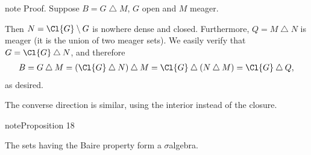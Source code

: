 \documentclass[letterpaper,10pt,english]{jupyterBook}
\begin{document}
\begin{sphinxadmonition}{note}
\sphinxAtStartPar
Proof. Suppose \(B = G \bigtriangleup M\), \(G\) open and \(M\) meager.

\sphinxAtStartPar
Then \(N = \Cl{G} \setminus G\) is nowhere dense and closed. Furthermore, \(Q = M \bigtriangleup N\) is meager (it is the union of two meager sets). We easily verify that \(G = \Cl{G} \bigtriangleup N\), and therefore
\begin{equation*}
\begin{split}
B = G \bigtriangleup M = (\Cl{G} \bigtriangleup N) \bigtriangleup M = \Cl{G} \bigtriangleup (N \bigtriangleup M) = \Cl{G} \bigtriangleup Q,
\end{split}
\end{equation*}
\sphinxAtStartPar
as desired.

\sphinxAtStartPar
The converse direction is similar, using the interior instead of the closure.
\end{sphinxadmonition}
\label{measure:prop-BP-sigma-algebra}
\begin{sphinxadmonition}{note}{Proposition 18}



\sphinxAtStartPar
The sets having the Baire property form a \(\sigma\)\sphinxhyphen{}algebra.
\end{sphinxadmonition}
\end{document}
